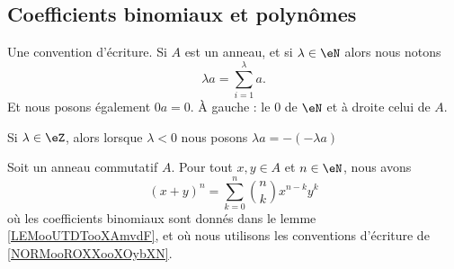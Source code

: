 \subsection{Coefficients binomiaux et polynômes}

\begin{normaltext}		\label{NORMooROXXooXOybXN}
	Une convention d'écriture. Si \( A\) est un anneau, et si \( \lambda\in \eN\) alors nous notons
	\begin{equation}
		\lambda a=\sum_{i=1}^{\lambda}a.
	\end{equation}
	Et nous posons également \( 0a=0\). À gauche : le \( 0\) de \( \eN\) et à droite celui de \( A\).

	Si \( \lambda\in \eZ\), alors lorsque \( \lambda<0\) nous posons \( \lambda a=  -(-\lambda a)  \)
\end{normaltext}


\begin{proposition}     \label{PropBinomFExOiL}
	Soit un anneau commutatif \( A\). Pour tout \( x,y\in A\) et \( n\in \eN\), nous avons
	\begin{equation}        \label{EqNewtonB}
		(x+y)^n=\sum_{k=0}^n{n\choose k}x^{n-k}y^k
	\end{equation}
	où les coefficients binomiaux sont donnés dans le lemme \ref{LEMooUTDTooXAmvdF}, et où nous utilisons les conventions d'écriture de \ref{NORMooROXXooXOybXN}.
\end{proposition}

